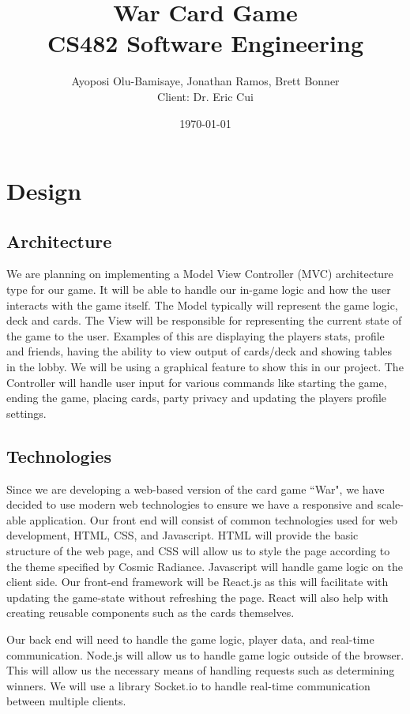 \documentclass[12pt]{article} %
\title{War Card Game
\\
CS482 Software Engineering}
\author{Ayoposi Olu-Bamisaye, Jonathan Ramos, Brett Bonner\\
Client: Dr. Eric Cui}
\date{\today}
\begin{document}
\maketitle

\pagebreak


\section{Design}

\subsection{Architecture}
We are planning on implementing a Model View Controller (MVC) architecture type for our game. It will be able to handle our in-game logic and how the user interacts with the game itself.
The Model typically will represent the game logic, deck and cards. The View will be responsible for representing the current state of the game to the user. Examples of this are displaying the players stats, profile and friends, having the ability to view output of cards/deck and showing tables in the lobby. We will be using a graphical feature to show this in our project. The Controller will handle user input for various commands like starting the game, ending the game, placing cards, party privacy and updating the players profile settings.

\subsection{Technologies}
Since we are developing a web-based version of the card game ``War", we have decided to use modern web technologies to ensure we have a responsive and scale-able application. Our front end will consist of common technologies used for web development, HTML, CSS, and Javascript. HTML will provide the basic structure of the web page, and CSS will allow us to style the page according to the theme specified by Cosmic Radiance. Javascript will handle game logic on the client side. Our front-end framework will be React.js as this will facilitate with updating the game-state without refreshing the page. React will also help with creating reusable components such as the cards themselves. 

Our back end will need to handle the game logic, player data, and real-time communication. Node.js will allow us to handle game logic outside of the browser. This will allow us the necessary means of handling requests such as determining winners. We will use a library Socket.io to handle real-time communication between multiple clients. 
\end{document}
